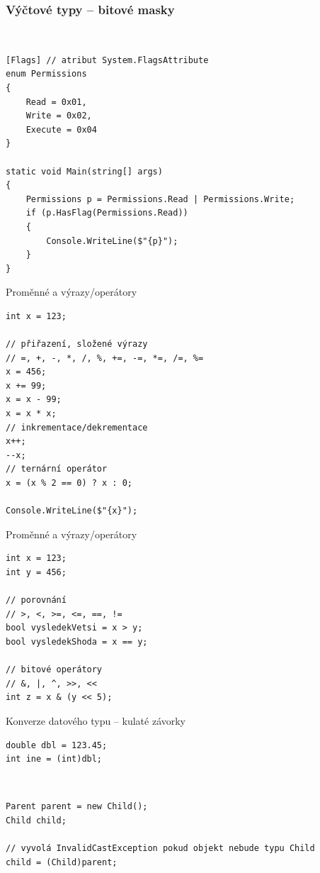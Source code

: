 \begin{frame}[fragile]
\frametitle{Výčtové typy -- bitové masky}
\begin{bonusblock}{~}
\begin{lstlisting}
[Flags] // atribut System.FlagsAttribute
enum Permissions
{
    Read = 0x01,
    Write = 0x02,
    Execute = 0x04
}

static void Main(string[] args)
{
    Permissions p = Permissions.Read | Permissions.Write;
    if (p.HasFlag(Permissions.Read))
    {
        Console.WriteLine($"{p}");
    }
}
\end{lstlisting}
\end{bonusblock}
\end{frame}




\begin{frame}[fragile]
\begin{exampleblock}{Proměnné a výrazy/operátory}
\begin{lstlisting}
int x = 123;

// přiřazení, složené výrazy
// =, +, -, *, /, %, +=, -=, *=, /=, %=
x = 456;
x += 99;
x = x - 99;
x = x * x;
// inkrementace/dekrementace
x++;
--x;
// ternární operátor
x = (x % 2 == 0) ? x : 0;

Console.WriteLine($"{x}");
\end{lstlisting}
\end{exampleblock}
\end{frame}


\begin{frame}[fragile]
\begin{exampleblock}{Proměnné a výrazy/operátory}
\begin{lstlisting}
int x = 123;
int y = 456;

// porovnání
// >, <, >=, <=, ==, !=
bool vysledekVetsi = x > y;
bool vysledekShoda = x == y;

// bitové operátory
// &, |, ^, >>, <<
int z = x & (y << 5);

\end{lstlisting}
\end{exampleblock}
\end{frame}



\begin{frame}[fragile]
\vfill
\begin{exampleblock}{Konverze datového typu -- kulaté závorky}
\begin{lstlisting}[basicstyle=\small]
double dbl = 123.45;
int ine = (int)dbl;
\end{lstlisting}
\end{exampleblock}
\vfill
\begin{exampleblock}{~}
\begin{lstlisting}[basicstyle=\small]
Parent parent = new Child();
Child child;

// vyvolá InvalidCastException pokud objekt nebude typu Child
child = (Child)parent; 
\end{lstlisting}
\end{exampleblock}
\vfill
\end{frame}





